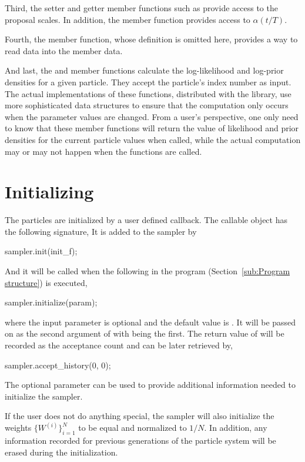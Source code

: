 Third, the setter and getter member functions such as 
provide access to the proposal scales. In addition, the member function
 provides access to $\alpha(t/T)$.

Fourth, the  member function, whose definition is omitted
here, provides a way to read data into the  member data.

And last, the  and  member
functions calculate the log-likelihood and log-prior densities for a given
particle. They accept the particle's index number as input. The actual
implementations of these functions, distributed with the library, use more
sophisticated data structures to ensure that the computation only occurs when
the parameter values are changed. From a user's perspective, one only need to
know that these member functions will return the value of likelihood and prior
densities for the current particle values when called, while the actual
computation may or may not happen when the functions are called.

\section{Initializing}
\label{sec:Initializing}

The particles are initialized by a user defined callback. The callable object
has the following signature,
It is added to the sampler by
\begin{cppcode}
sampler.init(init_f);
\end{cppcode}
And it will be called when the following in the program
(Section~\ref{sub:Program structure}) is executed,
\begin{cppcode}
sampler.initialize(param);
\end{cppcode}
where the input parameter  is optional and the default value
is . It will be passed on as the second argument of
 with  being the first. The
return value of  will be recorded as the acceptance count
and can be later retrieved by,
\begin{cppcode}
sampler.accept_history(0, 0);
\end{cppcode}
The optional parameter can be used to provide additional information needed to
initialize the sampler.

If the user does not do anything special, the sampler will also initialize the
weights $\{W^{(i)}\}_{i=1}^N$ to be equal and normalized to $1/N$. In
addition, any information recorded for previous generations of the particle
system will be erased during the initialization.

